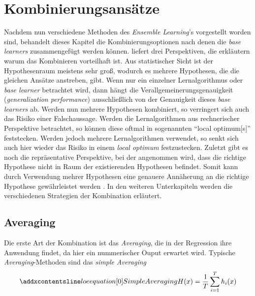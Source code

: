 \section{Kombinierungsansätze}
Nachdem nun verschiedene Methoden des \textit{Ensemble Learning}'s vorgestellt worden sind, behandelt dieses Kapitel die Kombinierungsoptionen nach denen die \textit{base learners} zusammengefügt werden können. \citeauthor[]{Dietterich.}\autocite[vgl. S.3f.]{Dietterich.} liefert drei Perspektiven, die erkläutern warum das Kombinieren vorteilhaft ist. Aus statistischer Sicht ist der Hypothesenraum meistens sehr groß, wodurch es mehrere Hypothesen, die die gleichen Ansätze anstreben, gibt. Wenn nur ein einzelner Lernalgorithmus oder \textit{base learner} betrachtet wird, dann hängt die Verallgemeinerungsgenauigkeit (\textit{generalization performance}) ausschließlich von der Genauigkeit dieses \textit{base learners} ab. Werden nun mehrere Hypothesen kombiniert, so verringert sich auch das Risiko einer Falschaussage. Werden die Lernalgorithmen aus rechnerischer Perspektive betrachtet, so können diese oftmal in sogenannten \enquote{local optimum[s]}\autocite[S.193]{Zhou.2021} feststecken. Werden jedoch mehrere Lernalgorithmen verwendet, so senkt sich auch hier wieder das Risiko in einem \textit{local optimum} festzustecken. Zuletzt gibt es noch die repräsentative Perspektive, bei der angenommen wird, dass die richtige Hypothese nicht in Raum der existierenden Hypothesen befindet. Somit kann durch Verwendung mehrer Hypothesen eine genauere Annäherung an die richtige Hypothese gewährleistet werden \autocite[vgl. S.194]{Zhou.2021} \autocite[vgl. S.4]{Dietterich.}. In den weiteren Unterkapiteln werden die verschiedenen Strategien der Kombination erläutert.

\subsection{Averaging}

Die erste Art der Kombination ist das \textit{Averaging}, die in der Regression ihre Anwendung findet, da hier ein nummerischer Ouput erwartet wird. Typische \textit{Averaging}-Methoden sind das \textit{simple Averaging}
\begin{equation}
    \setequationentry{Simple Averaging}{}
    \begin{gathered}
        H(x) = \frac{1}{T}\sum_{i=1}^{T}h_{i}(x)
    \end{gathered}
    \label{eq:simpleAveraging}
\end{equation}


